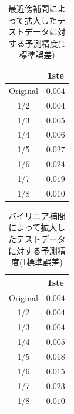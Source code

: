 \documentclass[a4j, 11pt]{jreport}
\begin{document}

 

\begin{table}[H]
  \centering
	\caption{最近傍補間によって拡大したテストデータに対する予測精度(1標準誤差)}
  \begin{tabular}{|c|c|}
		\hline
    & 1ste \\ \hline
    Original & $0.004$ \\ \hline
    1/2 & $0.004$ \\ \hline
    1/3 & $0.005$ \\ \hline
    1/4 & $0.006$ \\ \hline
    1/5 & $0.027$ \\ \hline
    1/6 & $0.024$ \\ \hline
    1/7 & $0.019$ \\ \hline
    1/8 & $0.010$ \\ \hline
  \end{tabular}
  \label{tb:accs_4_2_nearest_1ste}
\end{table}

\begin{table}[H]
  \centering
	\caption{バイリニア補間によって拡大したテストデータに対する予測精度(1標準誤差)}
  \begin{tabular}{|c|c|}
		\hline
    & 1ste \\ \hline
    Original & $0.004$ \\ \hline
    1/2 & $0.004$ \\ \hline
    1/3 & $0.004$ \\ \hline
    1/4 & $0.005$ \\ \hline
    1/5 & $0.018$ \\ \hline
    1/6 & $0.015$ \\ \hline
    1/7 & $0.023$ \\ \hline
    1/8 & $0.010$ \\ \hline
  \end{tabular}
  \label{tb:accs_4_2_linear_1ste}
\end{table}
\end{document}

